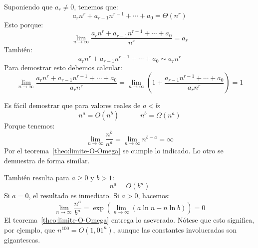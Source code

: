   Suponiendo que \(a_r \ne 0\),
  tenemos que:
  \begin{equation*}
    a_r n^r + a_{r - 1} n^{r - 1} + \dotsb + a_0 = \Theta(n^r)
  \end{equation*}
  Esto porque:
  \begin{equation*}
    \lim_{n \rightarrow \infty}
	 \frac{a_r n^r + a_{r - 1} n^{r - 1} + \dotsb + a_0}{n^r}
      = a_r
  \end{equation*}
  También:
  \begin{equation*}
    a_r n^r + a_{r - 1} n^{r - 1} + \dotsb + a_0 \sim a_r n^r
  \end{equation*}
  Para demostrar esto debemos calcular:
  \begin{equation*}
    \lim_{n \rightarrow \infty}
	 \frac{a_r n^r + a_{r - 1} n^{r - 1} + \dotsb + a_0}
	      {a_r n^r}
      = \lim_{n \rightarrow \infty}
	     \left(
	 1 + \frac{a_{r - 1} n^{r - 1} + \dotsb + a_0}{a_r n^r}
	     \right)
      = 1
  \end{equation*}

  Es fácil demostrar que para valores reales de \(a < b\):
  \begin{equation*}
    n^a
      = O(n^b)
    \hspace{3em}
    n^b
      = \Omega(n^a)
  \end{equation*}
  Porque tenemos:
  \begin{equation*}
    \lim_{n \rightarrow \infty} \frac{n^b}{n^a}
      = \lim_{n \rightarrow \infty} n^{b - a}
      = \infty
  \end{equation*}
  Por el teorema~\ref{theo:limite-O-Omega} se cumple lo indicado.
  Lo otro se demuestra de forma similar.

  También resulta para \(a \ge 0\) y \(b > 1\):
  \begin{equation*}
    n^a = O(b^n)
  \end{equation*}
  Si \(a = 0\),
  el resultado es inmediato.
  Si \(a > 0\),
  hacemos:
  \begin{equation*}
    \lim_{n \rightarrow \infty} \frac{n^a}{b^n}
      = \exp\left(
	 \lim_{n \rightarrow \infty}
	     (a \ln n - n \ln b)
	     \right)
      = 0
  \end{equation*}
  El teorema~\ref{theo:limite-O-Omega} entrega lo aseverado.
  Nótese que esto significa,
  por ejemplo,
  que \(n^{100} = O(1,01^n)\),
  aunque las constantes involucradas son gigantescas.


